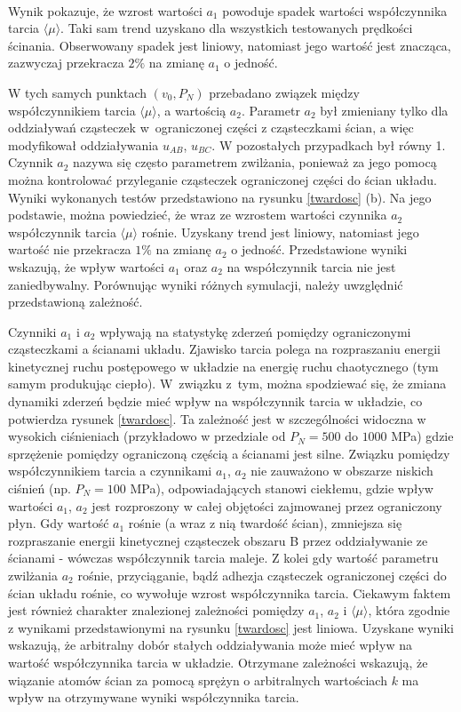 \documentclass[12pt,a4paper,openright]{report} %
\begin{document}
\\
Wynik pokazuje, że wzrost wartości $a_1$ powoduje spadek wartości współczynnika tarcia $\langle \mu \rangle$. Taki sam trend uzyskano dla wszystkich testowanych prędkości ścinania. Obserwowany spadek jest liniowy, natomiast jego wartość jest znacząca, zazwyczaj przekracza $2\%$ na zmianę $a_1$ o jedność. 

W tych samych punktach $(v_0, P_N)$ przebadano związek między współczynnikiem tarcia $\langle \mu \rangle$, a wartością $a_2$. Parametr $a_2$ był zmieniany tylko dla oddziaływań cząsteczek w~ograniczonej części z cząsteczkami ścian, a więc modyfikował oddziaływania $u_{AB}$, $u_{BC}$. W pozostałych przypadkach był równy 1. Czynnik $a_2$ nazywa się często parametrem zwilżania, ponieważ za jego pomocą można kontrolować przyleganie cząsteczek ograniczonej części do ścian układu. Wyniki wykonanych testów przedstawiono na rysunku \ref{twardosc} (b). Na jego podstawie, można powiedzieć, że wraz ze wzrostem wartości czynnika $a_2$ współczynnik tarcia $\langle \mu \rangle$ rośnie. Uzyskany trend jest liniowy, natomiast jego wartość nie przekracza $1\%$ na zmianę $a_2$ o jedność. Przedstawione wyniki wskazują, że wpływ wartości $a_1$ oraz $a_2$ na współczynnik tarcia nie jest zaniedbywalny. Porównując wyniki różnych symulacji, należy uwzględnić przedstawioną zależność.  

Czynniki $a_1$ i $a_2$ wpływają na statystykę zderzeń pomiędzy ograniczonymi cząsteczkami a ścianami układu. Zjawisko tarcia polega na rozpraszaniu energii kinetycznej ruchu postępowego w układzie na energię ruchu chaotycznego (tym samym produkując ciepło). W~związku z~tym, można spodziewać się, że zmiana dynamiki zderzeń będzie mieć wpływ na współczynnik tarcia w układzie, co potwierdza rysunek \ref{twardosc}. Ta zależność jest w szczególności widoczna w wysokich ciśnieniach (przykładowo w przedziale od $P_N = 500$ do $1000$ MPa) gdzie sprzężenie pomiędzy ograniczoną częścią a ścianami jest silne. Związku pomiędzy współczynnikiem tarcia a czynnikami $a_1$, $a_2$ nie zauważono w obszarze niskich ciśnień (np. $P_N=100$ MPa), odpowiadających stanowi ciekłemu, gdzie wpływ wartości $a_1$, $a_2$ jest rozproszony w całej objętości zajmowanej przez ograniczony płyn. Gdy wartość $a_1$ rośnie (a wraz z nią twardość ścian), zmniejsza się rozpraszanie energii kinetycznej cząsteczek obszaru B przez oddziaływanie ze ścianami - wówczas współczynnik tarcia maleje. Z kolei gdy wartość parametru zwilżania $a_2$ rośnie, przyciąganie, bądź adhezja cząsteczek ograniczonej części do ścian układu rośnie, co wywołuje wzrost współczynnika tarcia. Ciekawym faktem jest również charakter znalezionej zależności pomiędzy $a_1$, $a_2$ i $\langle \mu \rangle$, która zgodnie z wynikami przedstawionymi na rysunku \ref{twardosc} jest liniowa. Uzyskane wyniki wskazują, że arbitralny dobór stałych oddziaływania może mieć wpływ na wartość współczynnika tarcia w układzie. Otrzymane zależności wskazują, że wiązanie atomów ścian za pomocą sprężyn o arbitralnych wartościach $k$ ma wpływ na otrzymywane wyniki współczynnika tarcia.
%
\end{document}
